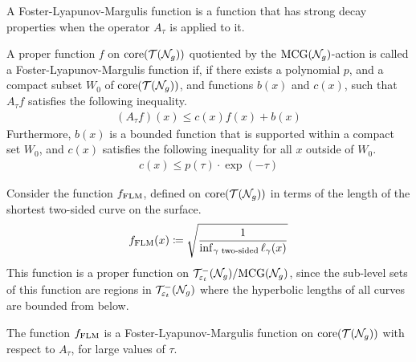 A Foster-Lyapunov-Margulis function is a function that has strong decay properties when the operator $A_{\tau}$ is applied to it.

\begin{definition}
  \label{defn:flm}
  A proper function $f$ on $\mathrm{core}(\mathcal{T}(\mathcal{N}_g))$ quotiented by the $\mathrm{MCG}(\mathcal{N}_g)$-action is called a Foster-Lyapunov-Margulis function if, if there exists a polynomial $p$, and a compact subset $W_0$ of $\mathrm{core}(\mathcal{T}(\mathcal{N}_g))$, and functions $b(x)$ and $c(x)$, such that $A_{\tau}f$ satisfies the following inequality.
  \begin{align*}
    (A_{\tau}f)(x) \leq c(x) f(x) + b(x)
  \end{align*}
  Furthermore, $b(x)$ is a bounded function that is supported within a compact set $W_0$, and $c(x)$ satisfies the following inequality for all $x$ outside of $W_0$.
  \begin{align*}
    c(x) \leq p(\tau) \cdot \exp(-\tau)
  \end{align*}
\end{definition}

Consider the function $f_{\mathrm{FLM}}$, defined on $\mathrm{core}(\mathcal{T}(\mathcal{N}_g))$ in terms of the length of the shortest two-sided curve on the surface.
\begin{align*}
  f_{\mathrm{FLM}}(x) \coloneqq \sqrt{\frac{1}{\inf_{\text{$\gamma$ two-sided}}\ell_{\gamma}(x)}}
\end{align*}
This function is a proper function on $\mathcal{T}_{\varepsilon_t}^{-}(\mathcal{N}_g)/\mathrm{MCG}(\mathcal{N}_g)$, since the sub-level sets of this function are regions in $\mathcal{T}_{\varepsilon_t}^{-}(\mathcal{N}_g)$ where the hyperbolic lengths of all curves are bounded from below.

\begin{proposition}
  \label{prop:flm-is-flm}
  The function $f_{\mathrm{FLM}}$ is a Foster-Lyapunov-Margulis function on $\mathrm{core}(\mathcal{T}(\mathcal{N}_g))$ with respect to $A_{\tau}$, for large values of $\tau$.
\end{proposition}

